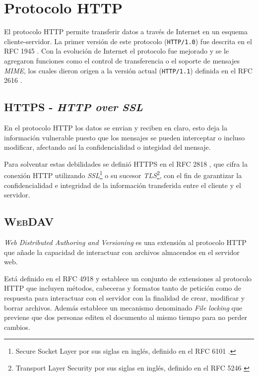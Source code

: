 
\section {Protocolo \textsc{HTTP}}

El protocolo \textsc{HTTP} permite transferir datos a trav\'{e}s de Internet en un esquema cliente-servidor. La primer versi\'{o}n de este protocolo (\texttt{HTTP/1.0}) fue descrita en el \textsc{RFC} 1945 \cite{_rfc_????-1}. Con la evoluci\'{o}n de Internet el protocolo fue mejorado y se le agregaron funciones como el control de transferencia o el soporte de mensajes \textit{MIME}, los cuales dieron origen a la versi\'{o}n actual (\texttt{HTTP/1.1}) definida en el RFC 2616 \cite{_rfc_????}.

  \subsection {\textsc{HTTPS} - \textit{HTTP over SSL}}

En el protocolo \textsc{HTTP} los datos se envian y reciben en claro, esto deja la informaci\'{o}n vulnerable puesto que los mensajes se pueden interceptar o incluso modificar, afectando as\'{i} la confidencialidad o integidad del mensaje.

Para solventar estas debilidades se defini\'{o} \textsc{HTTPS} en el \textsc{RFC} 2818 \cite{_rfc_????-6}, que cifra la conexi\'{o}n \textsc{HTTP} utilizando \emph{SSL}\footnote{Secure Socket Layer por sus siglas en ingl\'{e}s, definido en el \textsc{RFC} 6101 \cite{_rfc_????-4}.} o su sucesor \emph{TLS}\footnote{Transport Layer Security por sus siglas en ingl\'{e}s, definido en el \textsc{RFC} 5246 \cite{_rfc_????-3}}, con el fin de garantizar la confidencialidad e integridad de la informaci\'{o}n transferida entre el cliente y el servidor.

  \subsection {\textsc{WebDAV}}

\textit{Web Distributed Authoring and Versioning} es una extensi\'{o}n al protocolo \textsc{HTTP} que a\~{n}ade la capacidad de interactuar con archivos almacendos en el servidor web.

Est\'{a} definido en el \textsc{RFC} 4918 \cite{_rfc_????-2} y establece un conjunto de extensiones al protocolo \textsc{HTTP} que incluyen m\'{e}todos, cabeceras y formatos tanto de petici\'{o}n como de respuesta para interactuar con el servidor con la finalidad de crear, modificar y borrar archivos. Adem\'{a}s establece un mecanismo denominado \textit{File locking} que previene que dos personas editen el documento al mismo tiempo para no perder cambios.

